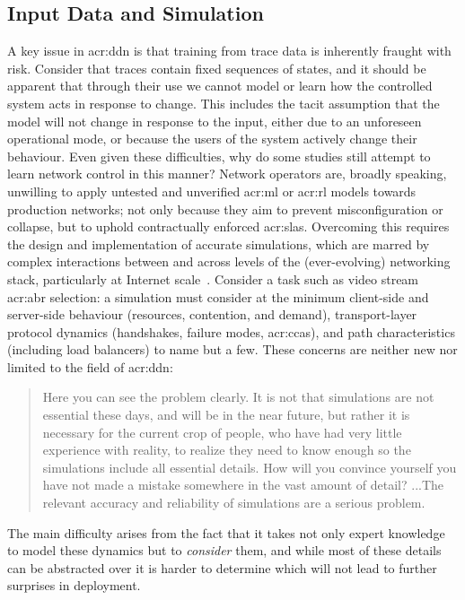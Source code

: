 \subsection{Input Data and Simulation}
A key issue in \gls{acr:ddn} is that training from trace data is inherently fraught with risk.
Consider that traces contain fixed sequences of states, and it should be apparent that through their use we cannot model or learn how the controlled system acts in response to change.
This includes the tacit assumption that the model will not change in response to the input, either due to an unforeseen operational mode, or because the users of the system actively change their behaviour.
Even given these difficulties, why do some studies still attempt to learn network control in this manner?
Network operators are, broadly speaking, unwilling to apply untested and unverified \gls{acr:ml} or \gls{acr:rl} models towards production networks; not only because they aim to prevent misconfiguration or collapse, but to uphold contractually enforced \glspl{acr:sla}.
Overcoming this requires the design and implementation of accurate simulations, which are marred by complex interactions between and across levels of the (ever-evolving) networking stack, particularly at Internet scale~\parencite{DBLP:journals/ton/X01c}.
Consider a task such as video stream \gls{acr:abr} selection: a simulation must consider at the minimum client-side and server-side behaviour (resources, contention, and demand), transport-layer protocol dynamics (handshakes, failure modes, \glspl{acr:cca}), and path characteristics (including load balancers) to name but a few.
These concerns are neither new nor limited to the field of \gls{acr:ddn}:
\begin{quotation}
\noindent
Here you can see the problem clearly.
It is not that simulations are not essential these days, and will be in the near future, but rather it is necessary for the current crop of people, who have had very little experience with reality, to realize they need to know enough so the simulations include all essential details.
How will you convince yourself you have not made a mistake somewhere in the vast amount of detail?
...The relevant accuracy and reliability of simulations are a serious problem.\\
\strut\hfill\parencite[pp. 248]{hamming-art-of-scieng} 
\end{quotation}
The main difficulty arises from the fact that it takes not only expert knowledge to model these dynamics but to \emph{consider} them, and while most of these details can be abstracted over it is harder to determine which will not lead to further surprises in deployment.

